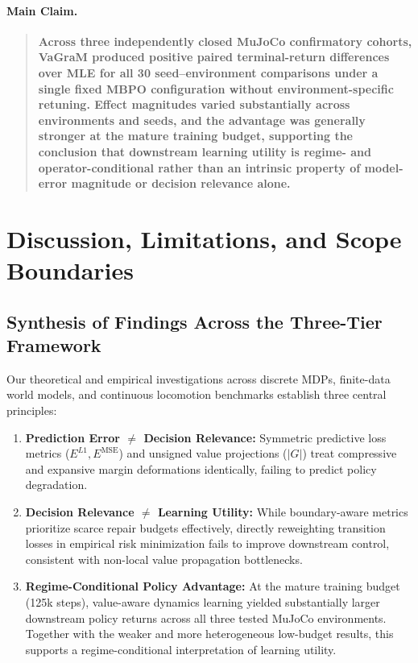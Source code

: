 \documentclass[journal,10pt,twocolumn]{IEEEtran}
\begin{document}
\paragraph{Main Claim.}
\begin{quote}
\textbf{Across three independently closed MuJoCo confirmatory cohorts, VaGraM produced positive paired terminal-return differences over MLE for all 30 seed--environment comparisons under a single fixed MBPO configuration without environment-specific retuning. Effect magnitudes varied substantially across environments and seeds, and the advantage was generally stronger at the mature training budget, supporting the conclusion that downstream learning utility is regime- and operator-conditional rather than an intrinsic property of model-error magnitude or decision relevance alone.}
\end{quote}

\section{Discussion, Limitations, and Scope Boundaries}
\label{sec:discussion_limitations}

\subsection{Synthesis of Findings Across the Three-Tier Framework}
\label{subsec:synthesis_three_tier}

Our theoretical and empirical investigations across discrete MDPs, finite-data world models, and continuous locomotion benchmarks establish three central principles:
\begin{enumerate}
    \item \textbf{Prediction Error $\neq$ Decision Relevance:} Symmetric predictive loss metrics ($E^{L1}, E^{\mathrm{MSE}}$) and unsigned value projections ($|G|$) treat compressive and expansive margin deformations identically, failing to predict policy degradation.
    \item \textbf{Decision Relevance $\neq$ Learning Utility:} While boundary-aware metrics prioritize scarce repair budgets effectively, directly reweighting transition losses in empirical risk minimization fails to improve downstream control, consistent with non-local value propagation bottlenecks.
    \item \textbf{Regime-Conditional Policy Advantage:} At the mature training budget (125k steps), value-aware dynamics learning yielded substantially larger downstream policy returns across all three tested MuJoCo environments. Together with the weaker and more heterogeneous low-budget results, this supports a regime-conditional interpretation of learning utility.
\end{enumerate}
\end{document}
